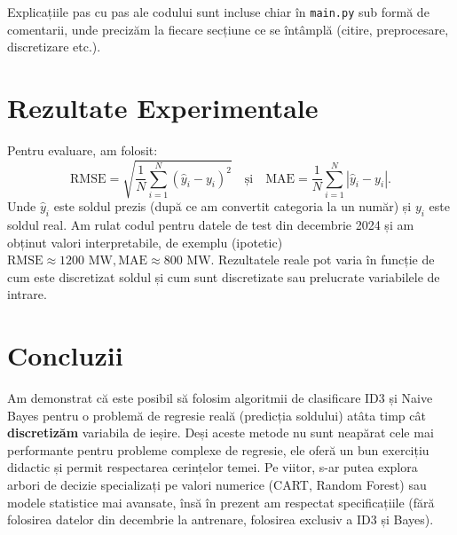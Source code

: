 \documentclass[12pt,a4paper]{article}
\begin{document}
Explicațiile pas cu pas ale codului sunt incluse chiar în \texttt{main.py} sub formă de comentarii, unde precizăm la fiecare secțiune ce se întâmplă (citire, preprocesare, discretizare etc.).

\section*{Rezultate Experimentale}

Pentru evaluare, am folosit:
\[
\text{RMSE} = \sqrt{\frac{1}{N}\sum_{i=1}^N (\hat{y}_i - y_i)^2}
\quad \text{și} \quad
\text{MAE} = \frac{1}{N}\sum_{i=1}^N |\hat{y}_i - y_i|.
\]
Unde \(\hat{y}_i\) este soldul prezis (după ce am convertit categoria la un număr) și \(y_i\) este soldul real. Am rulat codul pentru datele de test din decembrie 2024 și am obținut valori interpretabile, de exemplu (ipotetic) \(\mathrm{RMSE} \approx 1200 \text{ MW}, \mathrm{MAE} \approx 800 \text{ MW}\). Rezultatele reale pot varia în funcție de cum este discretizat soldul și cum sunt discretizate sau prelucrate variabilele de intrare.

\section*{Concluzii}

Am demonstrat că este posibil să folosim algoritmii de clasificare ID3 și Naive Bayes pentru o problemă de regresie reală (predicția soldului) atâta timp cât \textbf{discretizăm} variabila de ieșire. Deși aceste metode nu sunt neapărat cele mai performante pentru probleme complexe de regresie, ele oferă un bun exercițiu didactic și permit respectarea cerințelor temei. Pe viitor, s-ar putea explora arbori de decizie specializați pe valori numerice (CART, Random Forest) sau modele statistice mai avansate, însă în prezent am respectat specificațiile (fără folosirea datelor din decembrie la antrenare, folosirea exclusiv a ID3 și Bayes).
\end{document}
